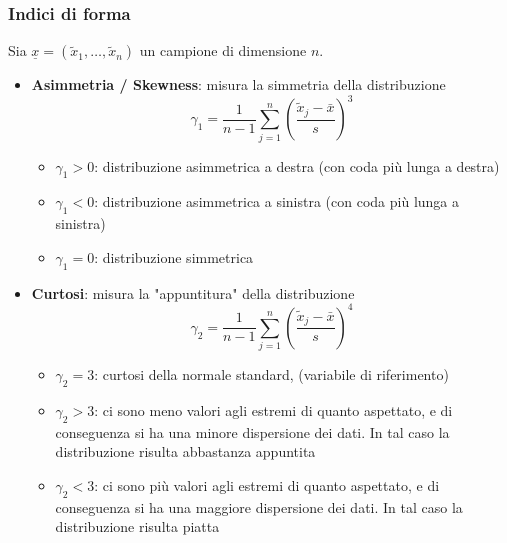 \documentclass[a4paper]{article}
\theoremstyle{break}
\theoremstyle{break}
\theoremstyle{break}
\theoremstyle{break}
\begin{document}
\subsubsection{Indici di forma}
Sia \( \underline{x} = (\tilde{x}_1, \ldots, \tilde{x}_n) \) un campione di dimensione 
\( n \).
\begin{itemize}
  \item \textbf{Asimmetria / Skewness}: misura la simmetria della distribuzione
    \[
      \gamma_1 = \frac{1}{n-1} \sum_{j=1}^{n} \left( \frac{\tilde{x}_j - \bar{x}}{s} \right)^3
    \] 
      \begin{itemize}
        \item \( \gamma_1 > 0 \): distribuzione asimmetrica a destra (con coda più lunga 
          a destra)
        \item \( \gamma_1 < 0 \): distribuzione asimmetrica a sinistra (con coda più
          lunga a sinistra)
        \item \( \gamma_1 = 0 \): distribuzione simmetrica
      \end{itemize}
  \item \textbf{Curtosi}: misura la "appuntitura" della distribuzione
    \[
      \gamma_2 = \frac{1}{n-1} \sum_{j=1}^{n} \left( \frac{\tilde{x}_j - \bar{x}}{s} \right)^4
    \]
    \begin{itemize}
      \item \( \gamma_2 = 3 \): curtosi della normale standard, (variabile di riferimento)
      \item \( \gamma_2 > 3 \): ci sono meno valori agli estremi di quanto aspettato, e
        di conseguenza si ha una minore dispersione dei dati. In tal caso la distribuzione
        risulta abbastanza appuntita
      \item \( \gamma_2 < 3 \): ci sono più valori agli estremi di quanto aspettato, e
        di conseguenza si ha una maggiore dispersione dei dati. In tal caso la distribuzione
        risulta piatta
    \end{itemize}
\end{itemize}
\end{document}
